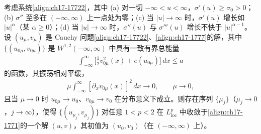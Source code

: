 \documentclass[../../main.tex]{subfiles}
\begin{document}
\begin{theorem}[等熵弹性的 $L^p$ 极限]\label{theorem:ch17-弹性Lp极限}
考虑系统\eqref{align:ch17-17722}，其中 (a) 对一切 $-\infty<u<\infty$，$\sigma'(u)\geqslant\sigma_0>0$；(b) $\sigma''$ 至多在 $(-\infty,\infty)$ 上一点处为零；(c) 当 $|u|\to\infty$ 时，$\sigma'(u)$ 增长如 $|u|^\alpha$（某 $\alpha\geqslant0$）；(d) 当 $|u|\to\infty$ 时，$\sigma''(u)$ 与 $\sigma'''(u)$ 增长不快于 $|u|^{\alpha-1}$。设 $(u_\mu,v_\mu)$ 是 Cauchy 问题\eqref{align:ch17-17722}、\eqref{align:ch17-1777}的解，其中 $\{(u_{0\mu},v_{0\mu})\}$ 是 $W^{1,2}(-\infty,\infty)$ 中具有一致有界总能量
\begin{align}
\int_{-\infty}^\infty\bigl[\tfrac{1}{2}v_{0\mu}^2(x)+e(u_{0\mu})\bigr]\,dx\leqslant a
\label{align:ch17-17723}
\end{align}
的函数，其振荡相对平缓，
\begin{align}
\mu\int_{-\infty}^\infty[\partial_x v_{0\mu}(x)]^2\,dx\longrightarrow0,\qquad\mu\to0,
\label{align:ch17-17724}
\end{align}
且当 $\mu\to0$ 时 $u_{0\mu}\to u_0$、$v_{0\mu}\to v_0$ 在分布意义下成立。则存在序列 $\{\mu_j\}$（$\mu_j\to0$，$j\to\infty$），使得 $\{(u_{\mu_j},v_{\mu_j})\}$ 对任意 $1<p<2$ 在 $L^p_{\mathrm{loc}}$ 中收敛于\eqref{align:ch17-1771}的一个解 $(u,v)$，其初值为 $(u_0,v_0)$（在 $(-\infty,\infty)$ 上）。
\end{theorem}
\end{document}
